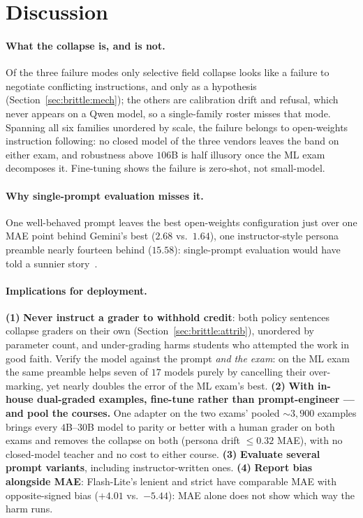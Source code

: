 \section{Discussion}
\label{sec:discussion}

\paragraph{What the collapse is, and is not.}
Of the three failure modes only selective field collapse looks like a failure to negotiate conflicting instructions, and only as a hypothesis (Section~\ref{sec:brittle:mech}); the others are calibration drift and refusal, which never appears on a Qwen model, so a single-family roster misses that mode. Spanning all six families unordered by scale, the failure belongs to open-weights instruction following: no closed model of the three vendors leaves the band on either exam, and robustness above $106$B is half illusory once the ML exam decomposes it. Fine-tuning shows the failure is zero-shot, not small-model. 

\paragraph{Why single-prompt evaluation misses it.}
One well-behaved prompt leaves the best open-weights configuration just over one MAE point behind Gemini's best ($2.68$ vs.\ $1.64$), one instructor-style persona preamble nearly fourteen behind ($15.58$): single-prompt evaluation would have told a sunnier story~\citep{sclar2024quantifyinglanguagemodelssensitivity,mizrahi2024stateartmultipromptllm}.








\paragraph{Implications for deployment.}

\textbf{(1)} \textbf{Never instruct a grader to withhold credit}: both policy sentences collapse graders on their own (Section~\ref{sec:brittle:attrib}), unordered by parameter count, and under-grading harms students who attempted the work in good faith. Verify the model against the prompt \emph{and the exam}: on the ML exam the same preamble helps seven of $17$ models purely by cancelling their over-marking, yet nearly doubles the error of the ML exam's best. \textbf{(2)} \textbf{With in-house dual-graded examples, fine-tune rather than prompt-engineer --- and pool the courses.} One adapter on the two exams' pooled $\sim 3{,}900$ examples brings every $4$B--$30$B model to parity or better with a human grader on both exams and removes the collapse on both (persona drift $\le 0.32$ MAE), with no closed-model teacher and no cost to either course. \textbf{(3)} \textbf{Evaluate several prompt variants}, including instructor-written ones. \textbf{(4)} \textbf{Report bias alongside MAE}: Flash-Lite's lenient and strict have comparable MAE with opposite-signed bias ($+4.01$ vs.\ $-5.44$): MAE alone does not show which way the harm runs.

